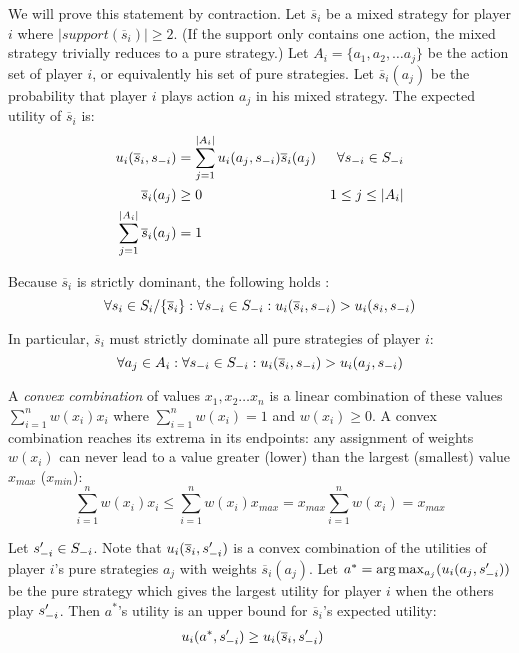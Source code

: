 \documentclass[../main.tex]{subfiles}
\begin{document}
\begin{solution}
	
	We will prove this statement by contraction.
	Let $\overline{s}_i$ be a mixed strategy for player $i$ where $|support(\overline{s}_i)| \geq 2$. (If the support only contains one action, the mixed strategy trivially reduces to a pure strategy.)
	Let $A_i = \{a_{1}, a_{2}, \dots a_{j}\}$ be the action set of player $i$, or equivalently his set of pure strategies.
	Let $\overline{s}_i(a_j)$ be the probability that player $i$ plays action $a_j$ in his mixed strategy.
	The expected utility of $\overline{s}_i$ is:
	\begin{align}
		u_i(\overline{s}_i, s_{\--i}) &= \sum\limits_{j=1}^{|A_i|} u_i(a_j, s_{\--i}) \overline{s}_i(a_j) & \forall s_{\--i} \in S_{\--i}\\
		\overline{s}_i(a_j) &\geq 0 & 1 \leq j \leq |A_i| \\
		\sum\limits_{j=1}^{|A_i|} \overline{s}_i(a_j) &= 1
	\end{align}
	
	Because $\overline{s}_i$ is strictly dominant, the following holds :
	\begin{equation}
		\forall s_i \in S_i/\{\overline{s}_i\}: \forall s_{\--i} \in S_{\--i} : u_i(\overline{s}_i,s_{\--i}) > u_i(s_i,s_{\--i})
	\end{equation}
	
	In particular, $\overline{s}_i$ must strictly dominate all pure strategies of player $i$:
	\begin{equation}
	\label{eq:q1-9:dominate-pure}
		\forall a_j \in A_i: \forall s_{\--i} \in S_{\--i} : u_i(\overline{s}_i,s_{\--i}) > u_i(a_j,s_{\--i})
	\end{equation}
	
	A \emph{convex combination} of values $x_1, x_2 \dots x_n$ is a linear combination of these values $\sum_{i=1}^{n} w(x_i) x_i$ where $\sum_{i=1}^{n} w(x_i) = 1$ and $w(x_i) \geq 0$. A convex combination reaches its extrema in its endpoints: any assignment of weights $w(x_i)$ can never lead to a value greater (lower) than the largest (smallest) value $x_{max}$ ($x_{min}$):
	\begin{equation}
		\sum_{i=1}^{n} w(x_i) x_i \leq \sum_{i=1}^{n} w(x_i) x_{max} = x_{max} \sum_{i=1}^{n} w(x_i) = x_{max}
	\end{equation}
	
	Let $s'_{\--i} \in S_{\--i}$. Note that $u_i(\overline{s}_i, s'_{\--i})$ is a convex combination of the utilities of player $i$'s pure strategies $a_j$ with weights $\overline{s}_i(a_j)$. Let $a^* = \text{arg}\max_{a_j}(u_i(a_j, s'_{\--i}))$ be the pure strategy which gives the largest utility for player $i$ when the others play $s'_{\--i}$. Then $a^*$'s utility is an upper bound for $\overline{s}_i$'s expected utility:
	\begin{align}
	\label{eq:q1-9:convex-bound}
		u_i(a^*, s'_{\--i}) &\geq u_i(\overline{s}_i, s'_{\--i})
	\end{align}
	

\end{solution}
\end{document}

